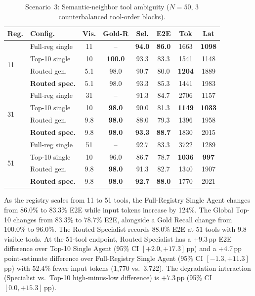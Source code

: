 \begin{table}[!htbp]
\centering
\caption{Scenario~3: Semantic-neighbor tool ambiguity ($N=50$, 3 counterbalanced tool-order blocks).}
\label{tab:tool_ambiguity}
{\small\setlength{\tabcolsep}{2.5pt}
\begin{tabular}{llcccccc}
\toprule
\textbf{Reg.} & \textbf{Config.} & \textbf{Vis.} & \textbf{Gold-R} & \textbf{Sel.} & \textbf{E2E} & \textbf{Tok} & \textbf{Lat} \\
\midrule
\multirow{4}{*}{11} & Full-reg single & 11 & -- & \textbf{94.0} & \textbf{86.0} & 1663 & \textbf{1098} \\
 & Top-10 single   & 10 & \textbf{100.0} & 93.3 & 83.3 & 1541 & 1148 \\
 & Routed gen.     & 5.1 & 98.0 & 90.7 & 80.0 & \textbf{1204} & 1889 \\
 & \textbf{Routed spec.} & 5.1 & 98.0 & 93.3 & 85.3 & 1441 & 1983 \\
\midrule
\multirow{4}{*}{31} & Full-reg single & 31 & -- & 91.3 & 84.7 & 2706 & 1157 \\
 & Top-10 single   & 10 & \textbf{98.0} & 90.0 & 81.3 & \textbf{1149} & \textbf{1033} \\
 & Routed gen.     & 9.8 & \textbf{98.0} & 88.0 & 79.3 & 1396 & 1958 \\
 & \textbf{Routed spec.} & 9.8 & \textbf{98.0} & \textbf{93.3} & \textbf{88.7} & 1830 & 2015 \\
\midrule
\multirow{4}{*}{51} & Full-reg single & 51 & -- & 92.7 & 83.3 & 3722 & 1289 \\
 & Top-10 single   & 10 & 96.0 & 86.7 & 78.7 & \textbf{1036} & \textbf{997} \\
 & Routed gen.     & 9.8 & \textbf{98.0} & 91.3 & 82.7 & 1340 & 1907 \\
 & \textbf{Routed spec.} & 9.8 & \textbf{98.0} & \textbf{92.7} & \textbf{88.0} & 1770 & 2021 \\
\bottomrule
\end{tabular}}
\end{table}

As the registry scales from 11 to 51 tools, the Full-Registry Single Agent changes from 86.0\% to 83.3\% E2E while input tokens increase by 124\%. The Global Top-10 changes from 83.3\% to 78.7\% E2E, alongside a Gold Recall change from 100.0\% to 96.0\%. The Routed Specialist records 88.0\% E2E at 51 tools with 9.8 visible tools. At the 51-tool endpoint, Routed Specialist has a +9.3\,pp E2E difference over Top-10 Single Agent (95\% CI $[+2.0, +17.3]$\,pp) and a +4.7\,pp point-estimate difference over Full-Registry Single Agent (95\% CI $[-1.3, +11.3]$\,pp) with 52.4\% fewer input tokens (1{,}770 vs.\ 3{,}722). The degradation interaction (Specialist vs.\ Top-10 high-minus-low difference) is $+7.3$\,pp (95\% CI $[0.0, +15.3]$\,pp).

